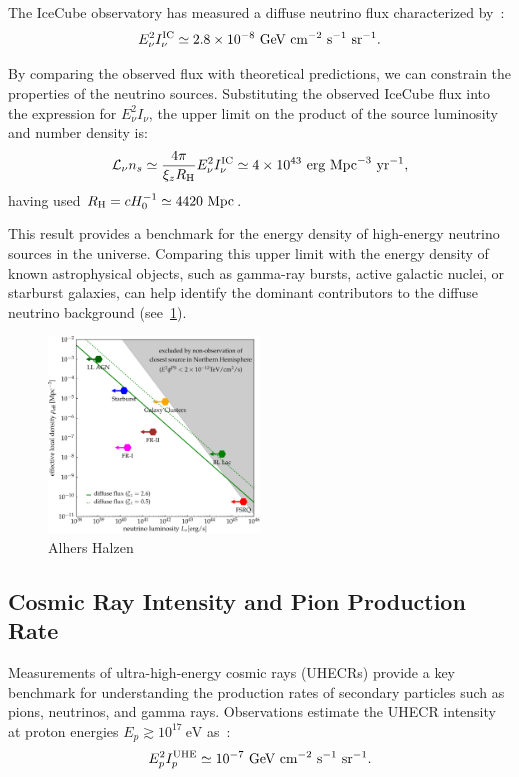 The IceCube observatory has measured a diffuse neutrino flux characterized by~\cite{}:
\begin{equation}
E_\nu^2 I_\nu^{\rm IC} \simeq 2.8 \times 10^{-8}~\text{GeV}~\text{cm}^{-2}~\text{s}^{-1}~\text{sr}^{-1}.
\end{equation}

By comparing the observed flux with theoretical predictions, we can constrain the properties of the neutrino sources. Substituting the observed IceCube flux into the expression for \(E_\nu^2 I_\nu\), the upper limit on the product of the source luminosity and number density is:
\begin{equation}
\mathcal{L}_\nu n_s \simeq \frac{4\pi}{\xi_z R_{\rm H}} E_\nu^2 I_\nu^{\rm IC} \simeq 4 \times 10^{43}~\text{erg}~\text{Mpc}^{-3}~\text{yr}^{-1},
\end{equation}
having used \(R_{\rm H} = c H_0^{-1} \simeq 4420~\text{Mpc}\). 

This result provides a benchmark for the energy density of high-energy neutrino sources in the universe. Comparing this upper limit with the energy density of known astrophysical objects, such as gamma-ray bursts, active galactic nuclei, or starburst galaxies, can help identify the dominant contributors to the diffuse neutrino background (see~\cref{fig:nuluminosity}). 

\begin{figure}[!t]
\centering
\includegraphics[width=0.5\textwidth]{figures/luminosityDISCOVERY.pdf}
\caption{Alhers Halzen~\cite{Ahlers2018ppnp}}
\label{fig:nuluminosity}
\end{figure}

\subsection{Cosmic Ray Intensity and Pion Production Rate} 

Measurements of ultra-high-energy cosmic rays (UHECRs) provide a key benchmark for understanding the production rates of secondary particles such as pions, neutrinos, and gamma rays. Observations estimate the UHECR intensity at proton energies \(E_p \gtrsim 10^{17}~\text{eV}\) as~\cite{add}:  
\begin{equation}
E_p^2 I^{\rm UHE}_p \simeq 10^{-7}~\text{GeV}~\text{cm}^{-2}~\text{s}^{-1}~\text{sr}^{-1}.
\end{equation}

